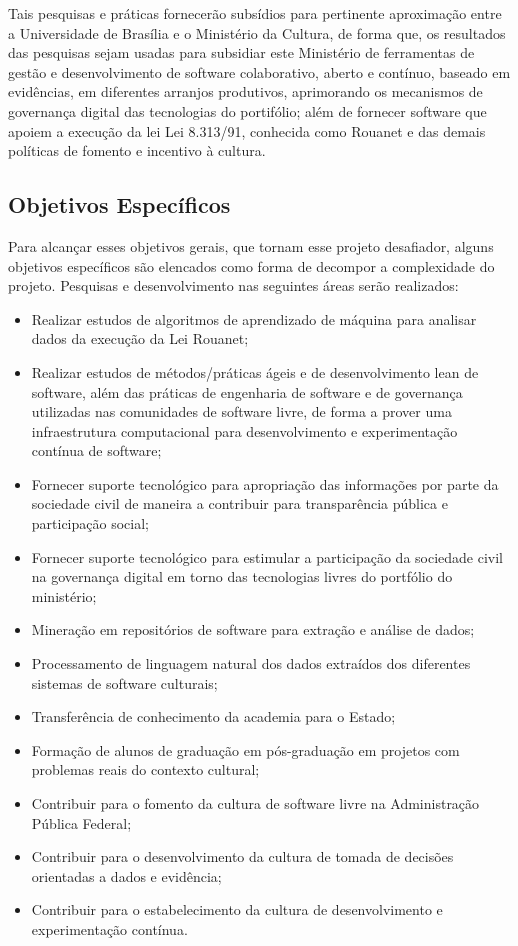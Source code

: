 Tais pesquisas e práticas fornecerão subsídios para pertinente aproximação entre a Universidade de Brasília e o Ministério da Cultura, de forma que, os resultados das pesquisas sejam usadas para subsidiar este Ministério de ferramentas de gestão e desenvolvimento
de software colaborativo, aberto e contínuo, baseado em evidências, em diferentes arranjos produtivos, aprimorando os mecanismos de governança digital das tecnologias do portifólio;
além de fornecer software que apoiem a execução da lei Lei 8.313/91,
conhecida como Rouanet e das demais políticas de fomento e incentivo à cultura. 

\subsection{Objetivos Específicos}

Para alcançar esses objetivos gerais, que tornam esse projeto desafiador, alguns objetivos específicos são elencados como forma de decompor a complexidade do projeto. Pesquisas e desenvolvimento nas seguintes áreas serão realizados: 

\begin{itemize}
\item Realizar estudos de algoritmos de aprendizado de máquina para analisar dados da execução da Lei Rouanet;
\item Realizar estudos de métodos/práticas ágeis e de desenvolvimento lean de software, além das práticas de engenharia de software e de governança utilizadas nas comunidades de software livre, de forma a prover uma infraestrutura computacional para desenvolvimento e experimentação contínua de software;
\item Fornecer suporte tecnológico para apropriação das informações por parte da sociedade civil de maneira a contribuir para transparência pública e participação social;
\item Fornecer suporte tecnológico para estimular a participação da sociedade civil na governança digital em torno das tecnologias livres do portfólio do ministério;
\item Mineração em repositórios de software para extração e análise de dados;
\item Processamento de linguagem natural dos dados extraídos dos diferentes sistemas de software culturais;
\item Transferência de conhecimento da academia para o Estado;
\item Formação de alunos de graduação em pós-graduação em projetos com problemas reais do contexto cultural;
\item Contribuir para o fomento da cultura de software livre na Administração Pública Federal;
\item Contribuir para o desenvolvimento da cultura de tomada de decisões orientadas a dados e evidência;
\item Contribuir para o estabelecimento da cultura de desenvolvimento e experimentação contínua.
\end{itemize}

